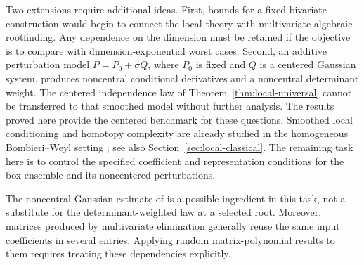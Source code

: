 Two extensions require additional ideas. First, bounds for a fixed bivariate
construction would begin to connect the local theory with multivariate
algebraic rootfinding. Any dependence on the dimension must be retained if
the objective is to compare with dimension-exponential worst cases. Second,
an additive perturbation model $P=P_0+\sigma Q$, where $P_0$ is fixed and $Q$
is a centered Gaussian system, produces noncentral conditional
derivatives and a noncentral determinant weight. The centered independence
law of Theorem~\ref{thm:local-universal} cannot be transferred to that smoothed
model without further analysis. The results proved here provide the centered
benchmark for these questions. Smoothed local conditioning and homotopy
complexity are already studied in the homogeneous Bombieri--Weyl setting
\cite{burgisser2011smale,armentano2016condition}; see also
Section~\ref{sec:local-classical}. The remaining task here is to control the
specified coefficient and representation conditions for the box ensemble
and its noncentered perturbations.

The noncentral Gaussian estimate of
\cite[Theorem~A.5]{barbarino2023monic} is a possible ingredient in this task,
not a substitute for the determinant-weighted law at a selected root.
Moreover, matrices produced by multivariate elimination generally reuse the
same input coefficients in several entries. Applying random matrix-polynomial
results to them requires treating these dependencies explicitly.
